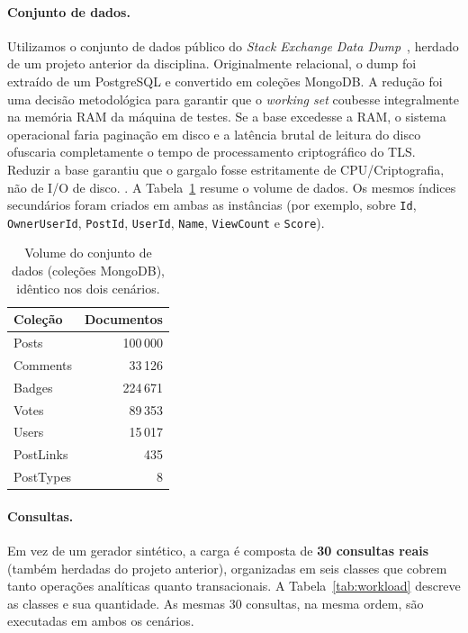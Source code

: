 \documentclass[12pt]{article}
\begin{document}
\paragraph{Conjunto de dados.} Utilizamos o conjunto de dados público do
\emph{Stack Exchange Data Dump}~\cite{stackexchange-dump}, herdado de um projeto
anterior da disciplina. Originalmente relacional, o dump foi extraído de um
PostgreSQL e convertido em coleções MongoDB. A redução foi uma decisão metodológica para garantir que o \textit{working set} coubesse integralmente na memória RAM da máquina de testes. Se a base excedesse a RAM, o sistema operacional faria paginação em disco e a latência brutal de leitura do disco ofuscaria completamente o tempo de processamento criptográfico do TLS. Reduzir a base garantiu que o gargalo fosse estritamente de CPU/Criptografia, não de I/O de disco. 
. A Tabela~\ref{tab:dataset} resume o volume de dados. Os mesmos índices
secundários foram criados em ambas as instâncias (por exemplo, sobre
\texttt{Id}, \texttt{OwnerUserId}, \texttt{PostId}, \texttt{UserId},
\texttt{Name}, \texttt{ViewCount} e \texttt{Score}).

\begin{table}[ht]
\centering
\caption{Volume do conjunto de dados (coleções MongoDB), idêntico nos dois cenários.}
\label{tab:dataset}
\begin{tabular}{@{}lr@{}}
\toprule
\textbf{Coleção} & \textbf{Documentos} \\
\midrule
Posts     & 100\,000\\
Comments  & 33\,126\\
Badges    & 224\,671\\
Votes     & 89\,353\\
Users     & 15\,017\\
PostLinks & 435\\
PostTypes & 8 \\
\bottomrule
\end{tabular}
\end{table}

\paragraph{Consultas.} Em vez de um gerador sintético, a carga é composta de
\textbf{30 consultas reais} (também herdadas do projeto anterior), organizadas em
seis classes que cobrem tanto operações analíticas quanto transacionais. A
Tabela~\ref{tab:workload} descreve as classes e sua quantidade. As mesmas 30
consultas, na mesma ordem, são executadas em ambos os cenários.
\end{document}
